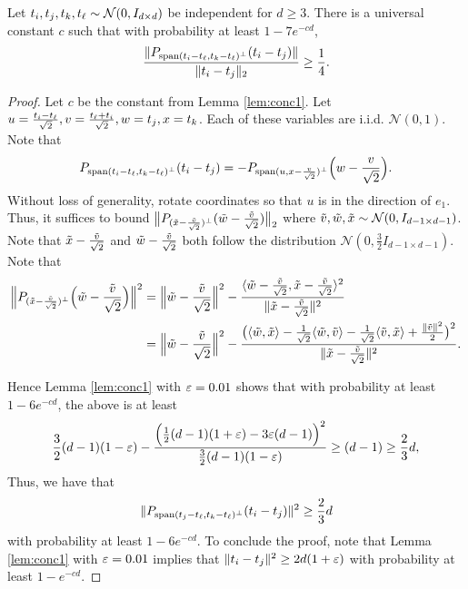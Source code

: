 \begin{lemma} \label{lem-beta-second}
Let $t_{i}, t_{j}, t_{k}, t_{\ell} \sim \mathcal{N}(0, I_{d \times d})$ be independent for $d \geq 3$.  There is a universal constant $c$ such that with probability at least $1 - 7 e^{-cd}$,
$$
\frac{\|P_{\operatorname{span}(t_{i} - t_{\ell}, t_{k} - t_{\ell})^\perp} (t_{i} - t_{j}) \|}{\|t_{i} - t_{j} \|_2} \geq \frac{1}{4}.
$$
\end{lemma}
\begin{proof}
Let $c$ be the constant from Lemma \ref{lem:conc1}.
Let $u = \frac{t_{i} - t_{\ell}}{\sqrt{2}}, v = \frac{t_{\ell} + t_{i}}{\sqrt{2}}, w = t_{j}, x = t_{k}$.  Each of these variables are i.i.d. $\mathcal{N}(0, 1)$.
Note that 
$$
P_{\operatorname{span}(t_{i} - t_{\ell}, t_{k} - t_{\ell})^\perp} (t_{i} - t_{j}) = -P_{\operatorname{span}(u, x - \frac{v}{\sqrt{2}})^\perp} \Bigl(w - \frac{v}{\sqrt{2}} \Bigr).
$$
Without loss of generality, rotate coordinates so that $u$ is in the direction of $e_1$.  Thus, it suffices to bound
$
\bigl \| P_{(\tilde{x} - \frac{\tilde{v}}{\sqrt{2}})^\perp} ( \tilde{w} - \frac{\tilde{v}}{\sqrt{2}} ) \bigr \|_2
$
where $\tilde{v}, \tilde{w}, \tilde{x} \sim \mathcal{N}(0, I_{d-1 \times d-1})$.  Note that $\tilde{x} - \frac{\tilde{v}}{\sqrt{2}}$ and $\tilde{w} - \frac{\tilde{v}}{\sqrt{2}}$ both follow the distribution $\mathcal{N}(0,\frac{3}{2} I_{d-1 \times d-1})$.
Note that 
\begin{align*}
\Bigl \| P_{(\tilde{x} - \frac{\tilde{v}}{\sqrt{2}})^\perp} \Bigl( \tilde{w} - \frac{\tilde{v}}{\sqrt{2}} \Bigr) \Bigr \|^2 
&= \Bigl \|\tilde{w} - \frac{\tilde{v}}{\sqrt{2}} \Bigr \|^2 - \frac{\langle \tilde{w} - \frac{\tilde{v}}{\sqrt{2}}, \tilde{x} - \frac{\tilde{v}}{\sqrt{2}} \rangle^2}{\| \tilde{x} - \frac{\tilde{v}}{\sqrt{2}}\|^2} \\
&= \Bigl \|\tilde{w} - \frac{\tilde{v}}{\sqrt{2}} \Bigr \|^2 - \frac{\bigl (\langle \tilde{w}, \tilde{x} \rangle - \frac{1}{\sqrt{2}} \langle \tilde{w}, \tilde{v} \rangle - \frac{1}{\sqrt{2}} \langle \tilde{v}, \tilde{x} \rangle + \frac{\| \tilde{v}\|^2}{2} \bigr)^2}{\| \tilde{x} - \frac{\tilde{v}}{\sqrt{2}}\|^2}.
\end{align*}

Hence Lemma \ref{lem:conc1} with $\varepsilon = 0.01$ shows that  with probability at least $1 - 6 e^{-c d}$, the above is at least
\begin{align*}
\frac{3}{2} (d-1) (1-\varepsilon) - \frac{\Bigl(\frac{1}{2} (d-1) (1+\varepsilon) - 3 \varepsilon (d-1)\Bigr)^2}{\frac{3}{2} (d-1) (1-\varepsilon)} \geq (d-1) \geq \frac{2}{3} d,
\end{align*}
Thus, we have that 
$$
\|P_{\operatorname{span}(t_{j} - t_{\ell}, t_{k} - t_{\ell})^\perp} (t_{i} - t_{j}) \|^2  \geq \frac{2}{3} d
$$
with probability at least $1 - 6 e^{-c d}$.  To conclude the proof, note that Lemma \ref{lem:conc1} with $\varepsilon = 0.01$ implies that $\|t_{i} - t_{j}\|^2 \geq 2 d ( 1+\varepsilon)$ with probability at least $1 - e^{-c d}$.
\end{proof}

